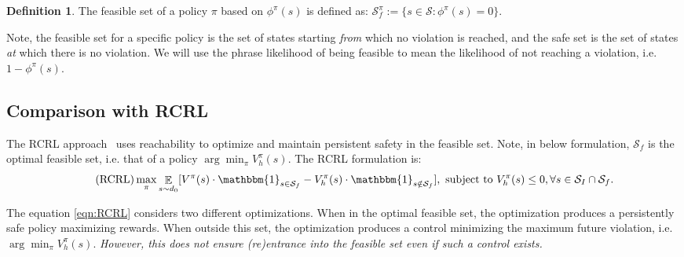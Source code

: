 \documentclass{article}
\theoremstyle{definition}
\newtheorem{definition}{Definition}
\DeclareMathOperator*{\E}{\mathbb{E}}
\begin{document}
\begin{definition}\label{def:feasible set} 
The feasible set of a policy $\pi$ based on $\phi^\pi(s)$ is defined as: $\mathcal S_{f}^{\pi} := \{ s \in \mathcal S: \phi^\pi (s) = 0  \}$.
\end{definition}
Note, the feasible set for a specific policy is the set of states starting \emph{from} which no violation is reached, and the safe set is the set of states \emph{at} which there is no violation. We will use the phrase likelihood of being feasible to mean the likelihood of not reaching a violation, i.e. $1-\phi^\pi(s)$.








\subsection{Comparison with RCRL} 
The RCRL approach~\cite{yu2022reachability} uses reachability to optimize and maintain persistent safety in the feasible set. Note, in below formulation, $\mathcal S_f$ is the optimal feasible set, i.e. that of a policy $\arg\min_\pi V^\pi_h(s)$. The RCRL formulation is:
\vspace{-2pt}
\begin{equation}
\tag{RCRL}
\label{eqn:RCRL}
    \max_\pi \E_{s\sim d_0} [V^{\pi}(s)\cdot \mathbbm{1}_{s\in \mathcal{S}_f} - V^{\pi}_h(s)\cdot \mathbbm{1}_{s\notin \mathcal{S}_f}],\text{ subject to } V^{\pi}_h (s)\leq 0, \forall s\in \mathcal{S}_I \cap \mathcal{S}_f.
\end{equation}

\vspace{-10pt}
The equation \ref{eqn:RCRL} considers two different optimizations. When in the optimal feasible set, the optimization produces a persistently safe policy maximizing rewards. When outside this set, the optimization produces a control minimizing the maximum future violation, i.e. $\arg\min_\pi V^{\pi}_h(s)$. \emph{However, this does not ensure (re)entrance into the feasible set even if such a control exists.} 

 
\end{document}
